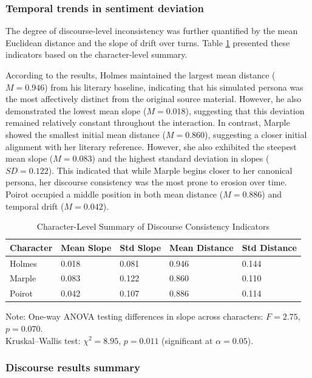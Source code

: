 \documentclass{article}
\begin{document}
\subsubsection{Temporal trends in sentiment deviation}

The degree of discourse-level inconsistency was further quantified by the mean Euclidean distance and the slope of drift over turns. Table \ref{tab:sentiment_char} presented these indicators based on the character-level summary.

According to the results, Holmes maintained the largest mean distance ($M = 0.946$) from his literary baseline, indicating that his simulated persona was the most affectively distinct from the original source material. However, he also demonstrated the lowest mean slope ($M = 0.018$), suggesting that this deviation remained relatively constant throughout the interaction. In contrast, Marple showed the smallest initial mean distance ($M = 0.860$), suggesting a closer initial alignment with her literary reference. However, she also exhibited the steepest mean slope ($M = 0.083$) and the highest standard deviation in slopes ($SD = 0.122$). This indicated that while Marple begins closer to her canonical persona, her discourse consistency was the most prone to erosion over time. Poirot occupied a middle position in both mean distance ($M = 0.886$) and temporal drift ($M = 0.042$).


\begin{table}[H]
\centering
\begin{tabular}{l l l l l}\toprule
Character & Mean Slope & Std Slope & Mean Distance & Std Distance \\\midrule
Holmes & 0.018 & 0.081 & 0.946 & 0.144 \\
Marple & 0.083 & 0.122 & 0.860 & 0.110 \\
Poirot & 0.042 & 0.107 & 0.886 & 0.114 \\ \bottomrule
\end{tabular}
\caption{Character-Level Summary of Discourse Consistency Indicators}
\label{tab:sentiment_char}
\begin{flushleft}
\footnotesize
Note: One-way ANOVA testing differences in slope across characters: $F = 2.75$, $p = 0.070$. \\
Kruskal--Wallis test: $\chi^2 = 8.95$, $p = 0.011$ (significant at $\alpha = 0.05$).
\end{flushleft}
\end{table}

\subsubsection{Discourse results summary}
\end{document}
